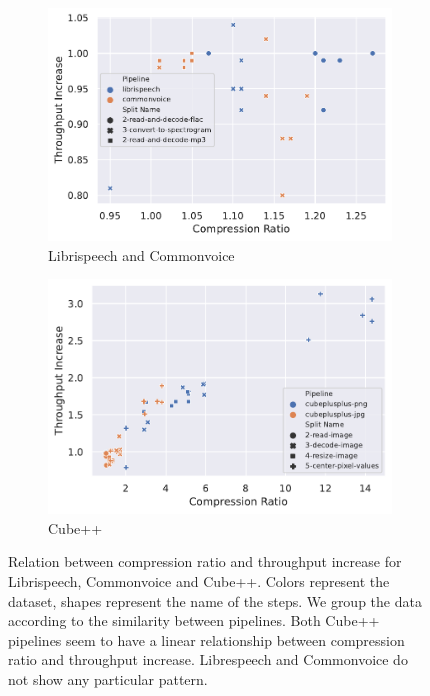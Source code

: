 \documentclass[sigconf,nonacm]{acmart}
\begin{document}
\begin{figure}
  \begin{subfigure}{0.49 \columnwidth}
    \includegraphics[width=\linewidth]{../images/compression-ratio-vs-throughput/librispeech-commonvoice-compression-ratio-vs-throughput.pdf}
    \caption{Librispeech and Commonvoice}
    \Description{}
    \label{fig:librispeech-commonvoice-compression-ratio-vs-throughput}
  \end{subfigure}
  \hfill %
  \begin{subfigure}{0.49 \columnwidth}
    \includegraphics[width=\linewidth]{../images/compression-ratio-vs-throughput/cubeplusplus-compression-ratio-vs-throughput.pdf}
    \caption{Cube++}
    \Description{}
    \label{fig:cubeplusplus-compression-ratio-vs-throughput}
  \end{subfigure}
  \caption{Relation between compression ratio and throughput increase for Librispeech, Commonvoice and Cube++.
    Colors represent the dataset, shapes represent the name of the steps.
    We group the data according to the similarity between pipelines.
    Both Cube++ pipelines seem to have a linear relationship between compression ratio and throughput increase.
    Librespeech and Commonvoice do not show any particular pattern.}
  \Description{}
  \label{fig:compression-ratio-vs-throughput}
\end{figure}
\end{document}

